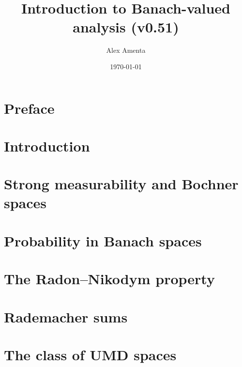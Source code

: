 \documentclass[a4paper,10pt]{amsbook}
\begin{document}
\title[Banach-valued analysis]{Introduction to Banach-valued analysis (v0.51)}
\date{\today}

\author[A. Amenta]{Alex Amenta}
\address{\noindent Mathematisches Institut \newline \indent Universit\"at Bonn, Bonn, Germany}

\maketitle
\tableofcontents


\chapter*{Preface}


\chapter{Introduction}
\label{sec:intro}


\chapter{Strong measurability and Bochner spaces}
\label{sec:Bochner-spaces}


\chapter{Probability in Banach spaces}
\label{sec:martingales} 


\chapter{The Radon--Nikodym property}
\label{sec:RNP}


\chapter{Rademacher sums}
\label{sec:rademacher}


\chapter{The class of UMD spaces}
\label{sec:UMD}

\end{document}
